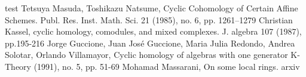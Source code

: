 \documentclass[12pt, reqno]{amsart}
\begin{document}
 



 

\begin{thebibliography}{test}
Tetsuya Masuda, Toshikazu Natsume, \newblock Cyclic Cohomology of Certain Affine Schemes. \newblock Publ. Res. Inst. Math. Sci. 21 (1985), no. 6, pp. 1261–1279
Christian Kassel, \newblock cyclic homology, comodules, and mixed complexes. \newblock J. algebra 107 (1987), pp.195-216
Jorge Guccione, Juan José Guccione, Maria Julia Redondo,  Andrea Solotar, Orlando Villamayor, \newblock Cyclic homology of algebras with one generator \newblock K-Theory (1991), no. 5, pp. 51-69
 Mohamad Massarani, \newblock On some local rings. \newblock arxiv
 


\end{thebibliography}


 


 
\end{document}
